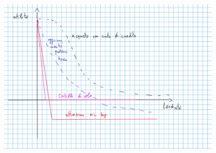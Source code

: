 \documentclass[12pt, oneside]{extbook}
\begin{document}
\begin{figure}[!h]
\centering
\includegraphics[scale=0.4]{immagini/image-000.jpg}
\end{figure}
\end{document}
